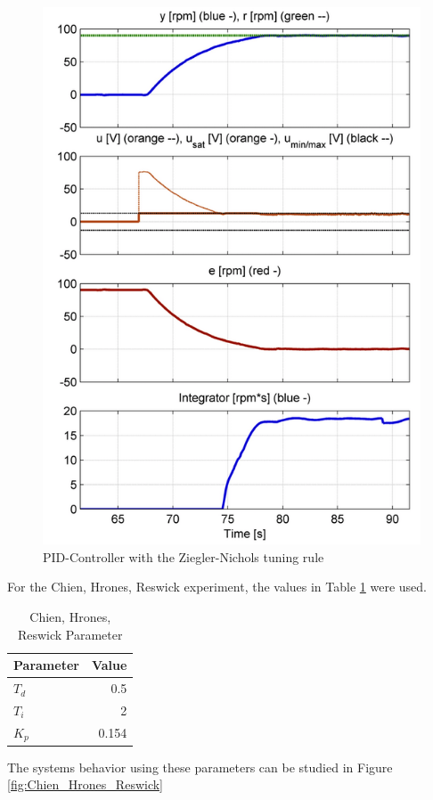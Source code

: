\begin{figure}[H]
\begin{center}
\includegraphics[width=0.5\linewidth]{images/general/PID/Ziegler_nichols}
\end{center}
\caption{PID-Controller with the Ziegler-Nichols tuning rule}
\label{fig:Ziegler_nichols}
\end{figure}

For the Chien, Hrones, Reswick experiment, the values in Table \ref{tab:chr_params} were used.

\begin{table}[H]
\begin{center}
\begin{tabular}{ l|r }
 \hline
 Parameter & Value\\
 \hline
 \hline
 $T_{d}$ & 0.5\\
 \hline
 $T_{i}$ & 2\\
 \hline
 $K_{p}$ & 0.154\\
 \hline
\end{tabular}
\end{center}
\caption{Chien, Hrones, Reswick Parameter}
\label{tab:chr_params}
\end{table}

The systems behavior using these parameters can be studied in Figure \ref{fig:Chien_Hrones_Reswick}

